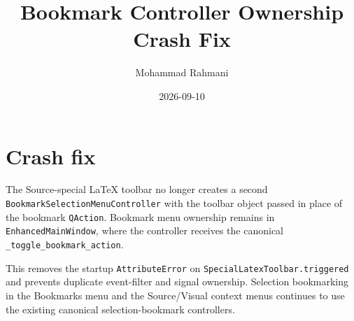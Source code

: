\documentclass[a4paper]{article}
\title{Bookmark Controller Ownership Crash Fix}
\date{2026-09-10}
\author{Mohammad Rahmani}
\begin{document}
   \maketitle

   \section{Crash fix}

   The Source-special LaTeX toolbar no longer creates a second
   \verb|BookmarkSelectionMenuController| with the toolbar object passed in
   place of the bookmark \verb|QAction|.  Bookmark menu ownership remains in
   \verb|EnhancedMainWindow|, where the controller receives the canonical
   \verb|_toggle_bookmark_action|.

   This removes the startup \verb|AttributeError| on
   \verb|SpecialLatexToolbar.triggered| and prevents duplicate event-filter and
   signal ownership.  Selection bookmarking in the Bookmarks menu and the
   Source/Visual context menus continues to use the existing canonical
   selection-bookmark controllers.

   
   
\end{document}
